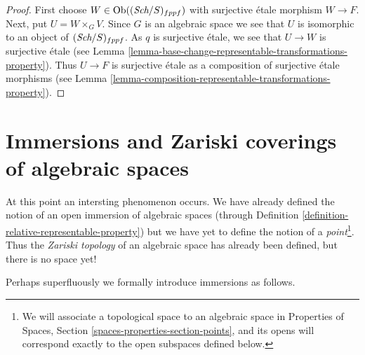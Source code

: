 \begin{proof}
First choose $W \in \mathop{\rm Ob}\nolimits((\textit{Sch}/S)_{fppf})$
with surjective \'etale morphism $W \to F$.
Next, put $U = W \times_G V$. Since $G$ is an algebraic space
we see that $U$ is isomorphic to an object of $(\textit{Sch}/S)_{fppf}$.
As $q$ is surjective \'etale, we see that $U \to W$ is surjective
\'etale (see
Lemma \ref{lemma-base-change-representable-transformations-property}).
Thus $U \to F$ is surjective \'etale as a composition of surjective
\'etale morphisms (see
Lemma \ref{lemma-composition-representable-transformations-property}).
\end{proof}



























\section{Immersions and Zariski coverings of algebraic spaces}
\label{section-Zariski}

\noindent
At this point an intersting phenomenon occurs. We have already defined
the notion of an open immersion of algebraic spaces (through
Definition \ref{definition-relative-representable-property})
but we have yet to define the notion of a {\it point}\footnote{We
will associate a topological space to an algebraic space in
Properties of Spaces, Section
\ref{spaces-properties-section-points},
and its opens will correspond exactly to the open subspaces defined below.}.
Thus the {\it Zariski topology} of an algebraic space
has already been defined, but there is no space yet!

\medskip\noindent
Perhaps superfluously we formally introduce immersions as follows.

